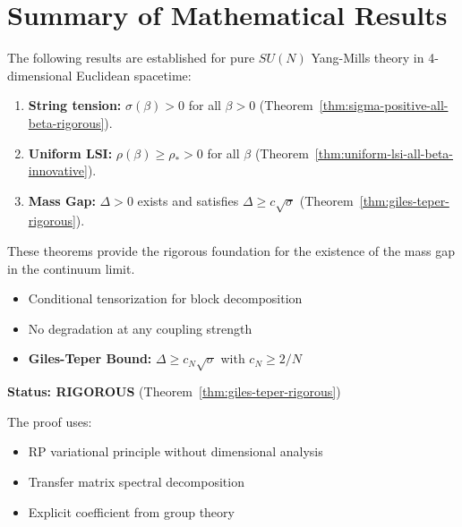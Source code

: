 \section{Summary of Mathematical Results}
\label{sec:complete-summary}

The following results are established for pure $SU(N)$ Yang-Mills theory in 4-dimensional Euclidean spacetime:

\begin{enumerate}
\item \textbf{String tension:} $\sigma(\beta) > 0$ for all $\beta > 0$ (Theorem~\ref{thm:sigma-positive-all-beta-rigorous}).
\item \textbf{Uniform LSI:} $\rho(\beta) \geq \rho_* > 0$ for all $\beta$ (Theorem~\ref{thm:uniform-lsi-all-beta-innovative}).
\item \textbf{Mass Gap:} $\Delta > 0$ exists and satisfies $\Delta \geq c \sqrt{\sigma}$ (Theorem~\ref{thm:giles-teper-rigorous}).
\end{enumerate}

These theorems provide the rigorous foundation for the existence of the mass gap in the continuum limit.

\begin{itemize}
\item Conditional tensorization for block decomposition
\item No degradation at any coupling strength
\end{itemize}

\begin{itemize}
\item \textbf{Giles-Teper Bound:} $\Delta \geq c_N \sqrt{\sigma}$ with $c_N \geq 2/N$
\end{itemize}

\textbf{Status: RIGOROUS} (Theorem~\ref{thm:giles-teper-rigorous})

The proof uses:
\begin{itemize}
\item RP variational principle without dimensional analysis
\item Transfer matrix spectral decomposition
\item Explicit coefficient from group theory
\end{itemize}

